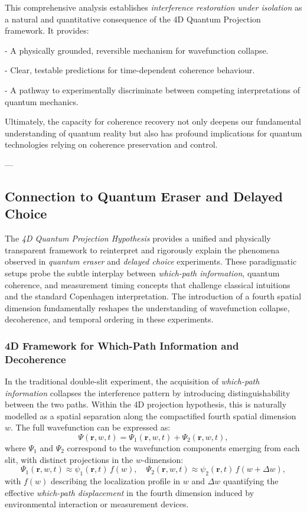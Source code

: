 \documentclass[12pt]{article}
\begin{document}
This comprehensive analysis establishes \emph{interference restoration under isolation} as a natural and quantitative consequence of the 4D Quantum Projection framework. It provides:

- A physically grounded, reversible mechanism for wavefunction collapse.

- Clear, testable predictions for time-dependent coherence behaviour.

- A pathway to experimentally discriminate between competing interpretations of quantum mechanics.

Ultimately, the capacity for coherence recovery not only deepens our fundamental understanding of quantum reality but also has profound implications for quantum technologies relying on coherence preservation and control.

---


\subsection{Connection to Quantum Eraser and Delayed Choice}

The \emph{4D Quantum Projection Hypothesis} provides a unified and physically transparent framework to reinterpret and rigorously explain the phenomena observed in \emph{quantum eraser} and \emph{delayed choice} experiments. These paradigmatic setups probe the subtle interplay between \emph{which-path information}, quantum coherence, and measurement timing concepts that challenge classical intuitions and the standard Copenhagen interpretation. The introduction of a fourth spatial dimension fundamentally reshapes the understanding of wavefunction collapse, decoherence, and temporal ordering in these experiments.

\subsubsection*{4D Framework for Which-Path Information and Decoherence}

In the traditional double-slit experiment, the acquisition of \emph{which-path information} collapses the interference pattern by introducing distinguishability between the two paths. Within the 4D projection hypothesis, this is naturally modelled as a spatial separation along the compactified fourth spatial dimension \(w\). The full wavefunction can be expressed as:
\begin{equation}
\Psi(\mathbf{r}, w, t) = \Psi_1(\mathbf{r}, w, t) + \Psi_2(\mathbf{r}, w, t),
\label{eq:4d_wavefunction}
\end{equation}
where \(\Psi_1\) and \(\Psi_2\) correspond to the wavefunction components emerging from each slit, with distinct projections in the \(w\)-dimension:
\begin{equation}
\Psi_1(\mathbf{r}, w, t) \approx \psi_1(\mathbf{r}, t) \, f(w), \quad \Psi_2(\mathbf{r}, w, t) \approx \psi_2(\mathbf{r}, t) \, f(w + \Delta w),
\label{eq:path_wavefunctions_w}
\end{equation}
with \(f(w)\) describing the localization profile in \(w\) and \(\Delta w\) quantifying the effective \emph{which-path displacement} in the fourth dimension induced by environmental interaction or measurement devices.
\end{document}
